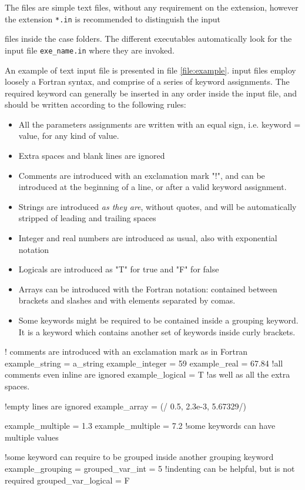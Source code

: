 The files are simple text files, without any requirement on the extension, 
however the extension \texttt{*.in} is recommended to distinguish the input 

files inside the case folders. The different executables automatically look 
for the input file \texttt{exe\_name.in} where they are invoked. 

An example of text input file is presented in file \ref{file:example}. 
input files employ loosely a Fortran syntax, and comprise of a series of 
keyword assignments.
The required keyword can generally be inserted in any order inside the input file, 
and should be written according to the following rules:
\begin{itemize}
\item All the parameters assignments are written with an equal sign, i.e. 
keyword = value, for any kind of value.
\item Extra spaces and blank lines are ignored
\item Comments are introduced with an exclamation mark "!", and can be introduced 
at the beginning of a line, or after a valid keyword assignment.
\item Strings are introduced \emph{as they are}, without quotes, and will be 
automatically stripped of leading and trailing spaces
\item Integer and real numbers are introduced as usual, also with exponential notation
\item Logicals are introduced as "T" for true and "F" for false
\item Arrays can be introduced with the Fortran notation: contained between brackets 
and slashes and with elements separated by comas. 
\item Some keywords might be required to be contained inside a grouping keyword. 
It is a keyword which contains another set of keywords inside curly brackets. 
\end{itemize}

\begin{inputfile}[frame=single, caption={example input file}, label={file:example}]
! comments are introduced with an exclamation mark as in Fortran
example_string   = a_string
example_integer  = 59
example_real     = 67.84 !all comments even inline are ignored
example_logical  = T     !as well as all the extra spaces.

!empty lines are ignored
example_array = (/ 0.5, 2.3e-3, 5.67329/)

example_multiple = 1.3
example_multiple = 7.2 !some keywords can have multiple values

!some keyword can require to be grouped inside another grouping keyword
example_grouping = {
	grouped_var_int = 5 !indenting can be helpful, but is not required
    grouped_var_logical = F
}
\end{inputfile}

